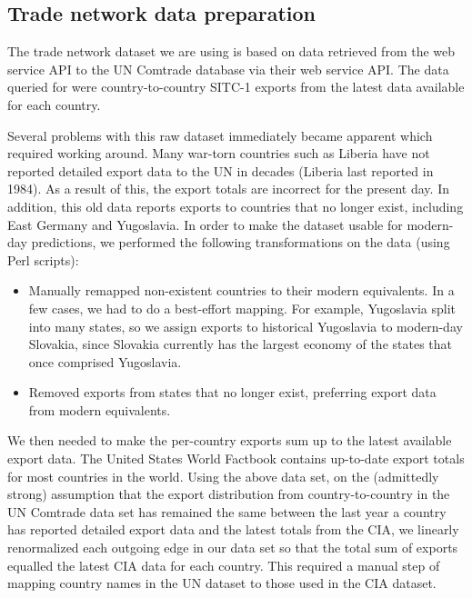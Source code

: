 \documentclass[10pt, journal,onecolumn]{IEEEtran}
\begin{document}
\subsection{{Trade network data preparation}}
\label{SubSec:TradeData}

The trade network dataset we are using is based on data retrieved from the web service API to the
UN Comtrade database \citep{uncomtradedata} via their web service API.
The data queried for were country-to-country SITC-1 exports from the latest data available
for each country.

Several problems with this raw dataset immediately became apparent which required working around.
Many war-torn countries such as Liberia have not reported detailed export data
to the UN in decades (Liberia last reported in 1984). As a result of this, the export totals
are incorrect for the present day. In addition, this old data reports exports to countries that
no longer exist, including East Germany and Yugoslavia. In order to make the dataset usable for
modern-day predictions, we performed the following transformations on the data (using Perl scripts):

\begin{itemize}
\item Manually remapped non-existent countries to their modern equivalents.
      In a few cases, we had to do a best-effort mapping. For example, Yugoslavia split into many
      states, so we assign exports to historical Yugoslavia to modern-day Slovakia,
      since Slovakia currently has the largest economy of the states that once comprised Yugoslavia.
\item Removed exports from states that no longer exist, preferring export data from
      modern equivalents.
\end{itemize}

We then needed to make the per-country exports sum up to the latest available export data.
The United States \citep{ciatotalexports} World Factbook contains up-to-date export totals
for most countries in the world. Using the above data set, on the (admittedly strong) assumption
that the export distribution
from country-to-country in the UN Comtrade data set has remained the same between the last year a
country has reported detailed export data and the latest totals from the CIA, we linearly renormalized
each outgoing edge in our data set so that the total sum of exports equalled the latest CIA data
for each country.
This required a manual step of mapping country names in the UN dataset to those used in
the CIA dataset.
\end{document}
